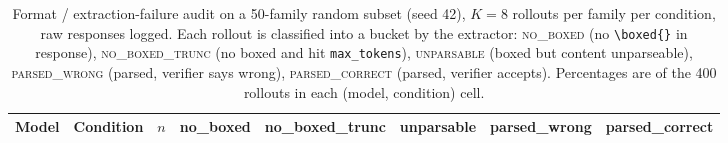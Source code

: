 \begin{table}[h]
\centering
\scriptsize
\caption{Format / extraction-failure audit on a 50-family random subset (seed 42), $K{=}8$ rollouts per family per condition, raw responses logged. Each rollout is classified into a bucket by the extractor: \textsc{no\_boxed} (no \texttt{\textbackslash boxed\{\}} in response), \textsc{no\_boxed\_trunc} (no boxed and hit \texttt{max\_tokens}), \textsc{unparsable} (boxed but content unparseable), \textsc{parsed\_wrong} (parsed, verifier says wrong), \textsc{parsed\_correct} (parsed, verifier accepts). Percentages are of the 400 rollouts in each (model, condition) cell.}
\label{tab:format_audit}
\vspace{4pt}
\setlength{\tabcolsep}{4pt}
\begin{tabular}{llrrrrrr}
\toprule
\textbf{Model} & \textbf{Condition} & \textbf{$n$} & \textbf{no\_boxed} & \textbf{no\_boxed\_trunc} & \textbf{unparsable} & \textbf{parsed\_wrong} & \textbf{parsed\_correct} \\
\midrule
\bottomrule
\end{tabular}
\end{table}
